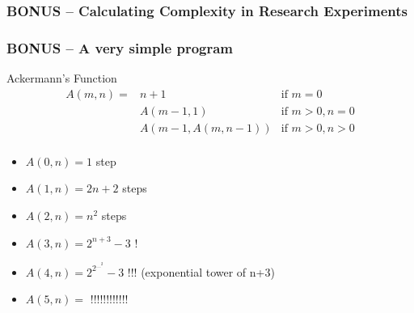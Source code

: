 \documentclass{beamer}
\begin{document}
\begin{frame}
  \frametitle{BONUS -- Calculating Complexity in Research Experiments}
\end{frame}

\begin{frame}
  \frametitle{BONUS -- A very simple program}

  \begin{block}{Ackermann's Function}
    \begin{eqnarray*}
      A(m,n) = & n+1 & \text{if } m = 0\\
      & A(m-1,1) & \text{if } m > 0, n = 0\\
      & A(m-1,A(m,n-1)) & \text{if } m > 0, n > 0\\
    \end{eqnarray*}
  \end{block}

  \begin{itemize}
    \item $A(0,n) = 1$ step
    \item $A(1,n) = 2n+2$ steps
    \item $A(2,n) = n^2$ steps
    \item $A(3,n) = 2^{n+3}-3$ \alert{!}
    \item $A(4,n) = 2^{2^{...^2}}-3$ \alert{!!!} (exponential tower of n+3)
    \item $A(5,n) = $ \alert{!!!!!!!!!!!!}
  \end{itemize}
\end{frame}

%
%
%
\end{document}
